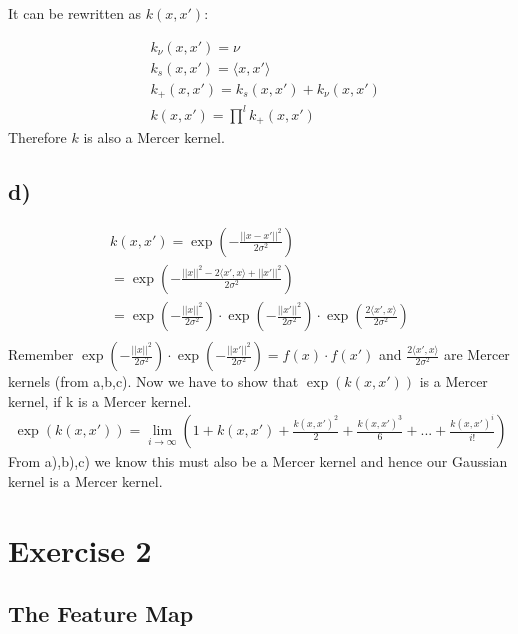 \documentclass{article}
\begin{document}
It can be rewritten as $k(x, x')$:

\begin{align}
    & k_\nu(x, x') = \nu \\
    & k_s(x, x') = \langle{}x, x'\rangle{} \\
    & k_+(x, x') = k_s(x, x') + k_\nu(x, x') \\
    & k(x, x') = \prod^l k_+(x, x')
\end{align}
Therefore $k$ is also a Mercer kernel.



\subsection*{d)}
\begin{gather*}
k(x,x') = \exp{}(- \frac{||x-x'||^2}{2\sigma^2}) \\
= \exp{}(-\frac{||x||^2 - 2\langle{}x',x\rangle{} + ||x'||^2}{2\sigma^2}) \\
= \exp{}(-\frac{||x||^2}{2\sigma^2}) \cdot \exp{}(-\frac{||x'||^2}{2\sigma^2}) \cdot \exp{}(\frac{2\langle{}x',x\rangle{}}{2\sigma^2}) \\ 
\end{gather*}
Remember $\exp{}(-\frac{||x||^2}{2\sigma^2}) \cdot \exp{}(-\frac{||x'||^2}{2\sigma^2}) = f(x)\cdot f(x')$ and $\frac{2\langle{}x',x\rangle{}}{2\sigma^2}$ are Mercer kernels (from a,b,c). Now we have to show that $\exp{}(k(x,x'))$ is a Mercer kernel, if k is a Mercer kernel.
\begin{gather*}
\exp{}(k(x,x')) = \lim\limits_{i \rightarrow \infty}{(1 + k(x,x') + \frac{k(x,x')^2}{2} + \frac{k(x,x')^3}{6} + ... + \frac{k(x,x')^i}{i!})}
\end{gather*}
From a),b),c) we know this must also be a Mercer kernel and hence our Gaussian kernel is a Mercer kernel. 



\section*{Exercise 2}

\subsection*{The Feature Map}
\end{document}
